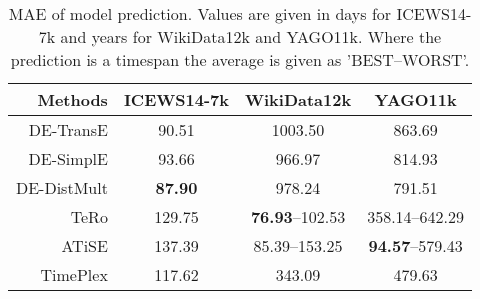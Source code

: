 \begin{table}[htb]
\centering
\begin{minipage}{0.95\columnwidth}
\centering

\caption{MAE of model prediction. Values are given in days for ICEWS14-7k and years for WikiData12k and YAGO11k. Where the prediction is a timespan the average is given as '\textsc{BEST}–\textsc{WORST}'.}
\vspace{-3mm}

\begin{tabular}{r|ccc}
\hline
Methods & ICEWS14-7k & WikiData12k & YAGO11k\\
\hline
DE-TransE & 90.51 & 1003.50 & 863.69\\
DE-SimplE & 93.66 & 966.97 & 814.93\\
DE-DistMult & \textbf{87.90} & 978.24 & 791.51\\
TeRo & 129.75 & \textbf{76.93}–102.53 & 358.14–642.29\\
ATiSE & 137.39 & 85.39–153.25 & \textbf{94.57}–579.43\\
TimePlex & 117.62 & 343.09 & 479.63\\
\hline
\end{tabular}


\label{tab:time_prediction_mae}
\end{minipage}
\end{table}